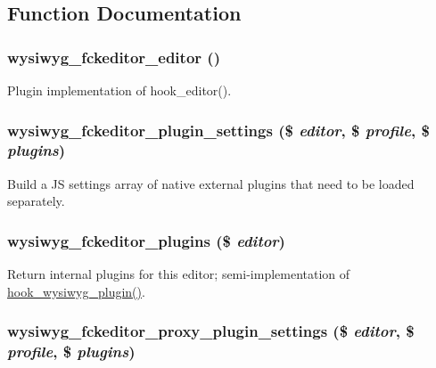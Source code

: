 \subsection{Function Documentation}
\hypertarget{fckeditor_8inc_a72a46c17832dfedbb0931bd88b610d7f}{
\subsubsection[{wysiwyg\_\-fckeditor\_\-editor}]{\setlength{\rightskip}{0pt plus 5cm}wysiwyg\_\-fckeditor\_\-editor ()}}
\label{fckeditor_8inc_a72a46c17832dfedbb0931bd88b610d7f}
Plugin implementation of hook\_\-editor(). \hypertarget{fckeditor_8inc_adf8922bafbaf68b19c78168dc6b4e5c9}{
\subsubsection[{wysiwyg\_\-fckeditor\_\-plugin\_\-settings}]{\setlength{\rightskip}{0pt plus 5cm}wysiwyg\_\-fckeditor\_\-plugin\_\-settings (\$ {\em editor}, \/  \$ {\em profile}, \/  \$ {\em plugins})}}
\label{fckeditor_8inc_adf8922bafbaf68b19c78168dc6b4e5c9}
Build a JS settings array of native external plugins that need to be loaded separately. \hypertarget{fckeditor_8inc_a345fbf4815a7bbc90ec93a0b198d7c1d}{
\subsubsection[{wysiwyg\_\-fckeditor\_\-plugins}]{\setlength{\rightskip}{0pt plus 5cm}wysiwyg\_\-fckeditor\_\-plugins (\$ {\em editor})}}
\label{fckeditor_8inc_a345fbf4815a7bbc90ec93a0b198d7c1d}
Return internal plugins for this editor; semi-\/implementation of \hyperlink{wysiwyg_8api_8php_abad2b35b32be0b20d73006b73205045c}{hook\_\-wysiwyg\_\-plugin()}. \hypertarget{fckeditor_8inc_a6a13c730790d46d1dfd2f9e5840f4617}{
\subsubsection[{wysiwyg\_\-fckeditor\_\-proxy\_\-plugin\_\-settings}]{\setlength{\rightskip}{0pt plus 5cm}wysiwyg\_\-fckeditor\_\-proxy\_\-plugin\_\-settings (\$ {\em editor}, \/  \$ {\em profile}, \/  \$ {\em plugins})}}
